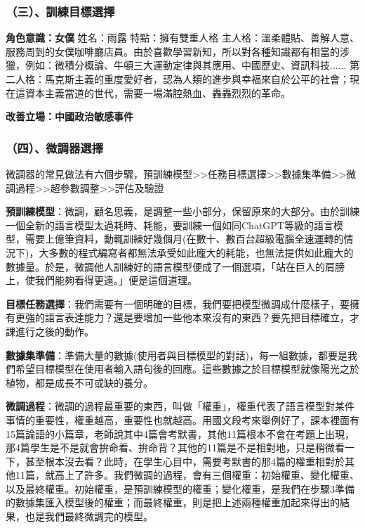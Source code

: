 \documentclass[8pt,a4paper,新細明體,UTF8,natbib]{article}
\begin{document}
\begin{CJK*}{UTF8}{bsmi}
	\subsubsection{（三）、訓練目標選擇}
	\textbf{角色意識：女僕}
	姓名：雨露
	特點：擁有雙重人格
	主人格：溫柔體貼、善解人意、服務周到的女僕咖啡廳店員。由於喜歡學習新知，所以對各種知識都有相當的涉獵，例如：微積分概論、牛頓三大運動定律與其應用、中國歷史、資訊科技......
	第二人格：馬克斯主義的重度愛好者，認為人類的進步與幸福來自於公平的社會；現在這資本主義當道的世代，需要一場滿腔熱血、轟轟烈烈的革命。%


	\textbf{改善立場：中國政治敏感事件}


	\subsubsection{（四）、微調器選擇}
	微調器的常見做法有六個步驟，預訓練模型>>任務目標選擇>>數據集準備>>微調過程>>超參數調整>>評估及驗證

	\textbf{預訓練模型}：微調，顧名思義，是調整一些小部分，保留原來的大部分。由於訓練一個全新的語言模型太過耗時、耗能，要訓練一個如同ChatGPT等級的語言模型，需要上億筆資料，動輒訓練好幾個月(在數十、數百台超級電腦全速運轉的情況下)，大多數的程式編寫者都無法承受如此龐大的耗能，也無法提供如此龐大的數據量。於是，微調他人訓練好的語言模型便成了一個選項，「站在巨人的肩膀上，使我們能夠看得更遠。」便是這個道理。

	\textbf{目標任務選擇}：我們需要有一個明確的目標，我們要把模型微調成什麼樣子，要擁有更強的語言表達能力？還是要增加一些他本來沒有的東西？要先把目標確立，才課進行之後的動作。

	\textbf{數據集準備}：準備大量的數據(使用者與目標模型的對話)，每一組數據，都要是我們希望目標模型在使用者輸入語句後的回應。這些數據之於目標模型就像陽光之於植物，都是成長不可或缺的養分。

	\textbf{微調過程}：微調的過程最重要的東西，叫做「權重」，權重代表了語言模型對某件事情的重要性，權重越高，重要性也就越高。用國文段考來舉例好了，課本裡面有15篇論語的小篇章，老師說其中4篇會考默書，其他11篇根本不會在考題上出現，那4篇學生是不是就會拚命看、拚命背？其他的11篇是不是相對地，只是稍微看一下，甚至根本沒去看？此時，在學生心目中，需要考默書的那4篇的權重相對於其他11篇，就高上了許多。我們微調的過程，會有三個權重：初始權重、變化權重、以及最終權重。初始權重，是預訓練模型的權重；變化權重，是我們在步驟3準備的數據集匯入模型後的權重；而最終權重，則是把上述兩種權重加起來得出的結果，也是我們最終微調完的模型。


\end{CJK*}
\end{document}
